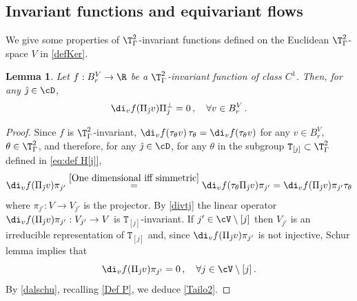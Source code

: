 \documentclass[11pt,a4paper,reqno]{article}
\numberwithin{equation}{section}
\newtheorem{lemma}[theorem]{Lemma}
\theoremstyle{definition}
\begin{document}
       
\begin{appendix}
        \section{Invariant functions and equivariant flows}\label{Appendix A}
           

        We  give some  properties of $\T^2_\Gamma $-invariant functions defined on the Euclidean $\T^2_\Gamma $-space $V$
        in \eqref{defKer}.
        
        \begin{lemma}\label{lm:AAA}
        Let $ f : B_r^V \to \R $  be a $ \T^2_\Gamma $-invariant function
        of class $ C^1 $. Then, for any 
        $ \hat \jmath \in \cD $,    \begin{equation}\label{Tailo2}
                \di_v f(\Pi_{\hat \jmath}v)  \Pi_{\hat \jmath}^\bot = 0 \, ,  \quad         \forall  v \in B_r^V \, . 
        \end{equation} 
        \end{lemma}
        
        \begin{proof}       
Since $ f $ is $ \T^2_\Gamma $-invariant,   $ \di_v f( \tau_\theta v) \, \tau_\theta = \di_v f( \tau_\theta v) $ for any $ v \in B_r^V $, $ \theta \in \T^2_\Gamma $,   
and therefore, for any $ \hat \jmath \in \cD $,   for any $ \theta $ in the subgroup $ {\mathtt T}_{[j]} \subset \T^2_\Gamma $ defined in \eqref{eq:def H[j]},    %
\begin{equation}\label{divtj}
            \di_v f(\Pi_{\hat \jmath}v) \pi_{j'}  \stackrel{\eqref{One dimensional iff simmetric}} = \di_v f( \tau_\theta \Pi_{\hat \jmath}v) \pi_{j'}   = \di_v f(\Pi_{\hat \jmath}v) \pi_{j'}\tau_\theta    
        \end{equation}
where $\pi_{j'}:V\to V_{j'}$ 
is the projector. 
        By 
        \eqref{divtj} 
         the linear operator $\di_v f(\Pi_{\hat \jmath}v) \pi_{j'}:V_{j'}\to V$ is $\mathtt{T}_{[j]}$-invariant.
If   $j'\in \cV\setminus[j]$ then $ V_{j'} $ is an irreducible representation of  $\mathtt{T}_{[j]}  $ and,            since $\di_v f(\Pi_{\hat \jmath}v) \pi_{j'}$ is not injective, Schur lemma implies that 
\begin{equation}
\label{dalschu}
\di_v f(\Pi_{\hat \jmath}v) \pi_{j'} = 0 \, , \quad 
\forall j \in \cV \setminus [j] \, . 
\end{equation}
By \eqref{dalschu}, recalling \eqref{Def P},  we deduce \eqref{Tailo2}.
        \end{proof}


\end{appendix}
\end{document}
